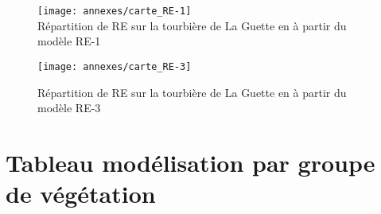\begin{figure}[!hbt]
\centering
\texttt{[image: annexes/carte\_RE-1]}\\
\caption{Répartition de RE sur la tourbière de La Guette en \si{\gcma} à partir du modèle RE-1}
\label{fig:rep_RE-1}
\texttt{[image: annexes/carte\_RE-3]}
\caption{Répartition de RE sur la tourbière de La Guette en \si{\gcma} à partir du modèle RE-3}
\label{fig:rep_RE-3}
\end{figure}


%
%




\clearpage
\section{Tableau modélisation par groupe de végétation}
\label{sec:mdl_grp_veg}

